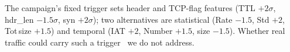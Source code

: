 \documentclass[journal]{IEEEtran}
\begin{document}
The campaign's fixed trigger sets header and TCP-flag features
(TTL $+2\sigma$, hdr\_len $-1.5\sigma$, syn $+2\sigma$); two alternatives are statistical
(Rate $-1.5$, Std $+2$, Tot\,size $+1.5$) and temporal (IAT $+2$, Number $+1.5$, size $-1.5$).
Whether real traffic could carry such a trigger~\cite{pierazzi2020problem} we do not address.

\end{document}
